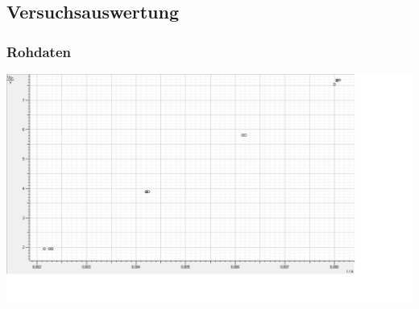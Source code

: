 \documentclass[12pt,a4paper]{article}
\begin{document}
\subsection{Versuchsauswertung}
\subsubsection{Rohdaten}
\includegraphics[scale=0.35]{raw_U_gegen_I.png}\\
\end{document}
